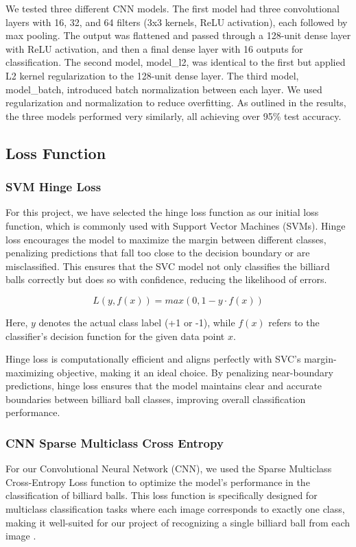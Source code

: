 \documentclass{article}
\begin{document}
We tested three different CNN models. The first model had three convolutional layers with 16, 32, and 64 filters (3x3 kernels, ReLU activation), each followed by max pooling. The output was flattened and passed through a 128-unit dense layer with ReLU activation, and then a final dense layer with 16 outputs for classification. The second model, model\_l2, was identical to the first but applied L2 kernel regularization to the 128-unit dense layer. The third model, model\_batch, introduced batch normalization between each layer. We used regularization and normalization to reduce overfitting. As outlined in the results, the three models performed very similarly, all achieving over 95\% test accuracy.

\subsection{Loss Function}
\label{sec:loss_function}
\subsubsection*{SVM Hinge Loss}
\label{sec:svm_hinge_loss}
For this project, we have selected the hinge loss function as our initial loss function, which is commonly used with Support Vector Machines (SVMs). Hinge loss encourages the model to maximize the margin between different classes, penalizing predictions that fall too close to the decision boundary or are misclassified. This ensures that the SVC model not only classifies the billiard balls correctly but does so with confidence, reducing the likelihood of errors. \cite{unknownMachineLearningApproach2023, bartlettClassificationRejectOption2008}

\begin{equation}
    L(y, f(x)) = max(0, 1-y \cdot f(x))
\end{equation}

Here, $y$ denotes the actual class label (+1 or -1), while $f(x)$ refers to the classifier's decision function for the given data point $x$.

Hinge loss is computationally efficient and aligns perfectly with SVC's margin-maximizing objective, making it an ideal choice. By penalizing near-boundary predictions, hinge loss ensures that the model maintains clear and accurate boundaries between billiard ball classes, improving overall classification performance. \cite{unknownMachineLearningApproach2023, bartlettClassificationRejectOption2008}

\subsubsection*{CNN Sparse Multiclass Cross Entropy}
\label{sec:cnn_sparse_multiclass_cross_entropy}
For our Convolutional Neural Network (CNN), we used the Sparse Multiclass Cross-Entropy Loss function to optimize the model’s performance in the classification of billiard balls. This loss function is specifically designed for multiclass classification tasks where each image corresponds to exactly one class, making it well-suited for our project of recognizing a single billiard ball from each image \cite{jeevaLossFunctionsNeural2023}.
\end{document}
